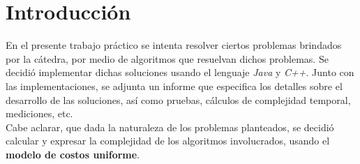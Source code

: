 \section*{Introducción}

En el presente trabajo práctico se intenta resolver ciertos problemas brindados por la c\'atedra, 
por medio de algoritmos que resuelvan dichos problemas. Se decidi\'o implementar dichas soluciones 
usando el lenguaje \textit{Java} y \textit{C++}. Junto con las implementaciones, se adjunta un 
informe que especifica los detalles sobre el desarrollo de las soluciones, as\'i como pruebas, 
cálculos de complejidad temporal, mediciones, etc.\\
Cabe aclarar, que dada la naturaleza de los problemas planteados, se decidi\'o calcular y 
expresar la complejidad de los algoritmos involucrados, usando el \textbf{modelo de costos uniforme}.
